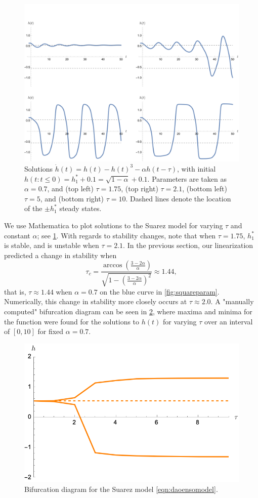 \documentclass[12pt]{article}
\begin{document}
\begin{figure}[!ht]
    \centering
    \includegraphics*[width=0.8\linewidth]{figures/suareznumerics.png}
    \caption{
    Solutions $\dot{h}(t) = h(t) - h(t)^3 - \alpha h(t - \tau)$, with initial $h(t : t \leq 0) = h_1^*+0.1 = \sqrt{1 - \alpha}+0.1$. Parameters are taken as $\alpha = 0.7$, and (top left) $\tau = 1.75$, (top right) $\tau = 2.1$, (bottom left) $\tau = 5$, and (bottom right) $\tau = 10$. Dashed lines denote the location of the $\pm h_1^*$ steady states.
    }
    \label{fig:suareznumerics}
\end{figure}

We use Mathematica to plot solutions to the Suarez model for varying $\tau$ and constant $\alpha$; see \cref{fig:suareznumerics}. With regards to stability changes, note that when $\tau = 1.75$, $h_1^*$ is stable, and is unstable when $\tau = 2.1$. In the previous section, our linearization predicted a change in stability when \[
    \tau_c = \frac{\arccos \left(\frac{3-2 \alpha}{\alpha}\right)}{\sqrt{1 - \left(\frac{ 3 -2\alpha}{\alpha}\right)^2}} \approx 1.44,
\]
that is, $\tau \approx 1.44$ when $\alpha = 0.7$ on the blue curve in \cref{fig:squareparam}. Numerically, this change in stability more closely occurs at $\tau \approx 2.0$. A "manually computed" bifurcation diagram can be seen in \cref{fig:suarezbfn}, where maxima and minima for the function were found for the solutions to $h(t)$ for varying $\tau$ over an interval of $[0, 10]$ for fixed $\alpha = 0.7$.
\begin{figure}[!ht]
    \centering
    \includegraphics*[width=0.4\linewidth]{figures/suarezbfn.png}
    \caption{Bifurcation diagram for the Suarez model \cref{eqn:daoensomodel}.}
    \label{fig:suarezbfn}
\end{figure}
\end{document}
